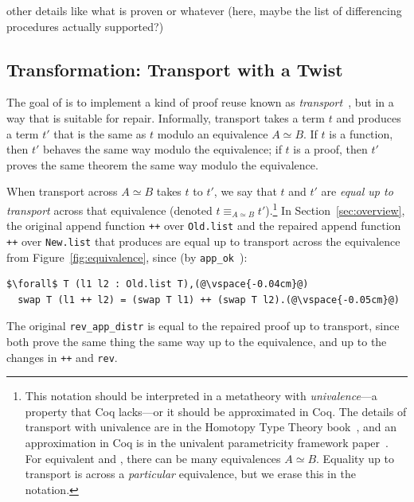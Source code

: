 other details like what is proven or whatever (here, maybe the list of differencing procedures actually supported?)

\subsection{Transformation: Transport with a Twist}
\label{sec:pi-spec-trans}

The goal of \toolnamec is to implement a kind of proof reuse known as \textit{transport}~\cite{univalent2013homotopy},
but in a way that is suitable for repair.
Informally, transport takes a term $t$ and produces a term $t'$ that is the same as $t$ modulo an equivalence $A \simeq B$.
If $t$ is a function, then $t'$ behaves the same way modulo the equivalence;
if $t$ is a proof, then $t'$ proves the same theorem the same way modulo the equivalence.

When transport across $A \simeq B$ takes $t$ to $t'$,
we say that $t$ and $t'$ are \textit{equal up to transport}
across that equivalence (denoted $t \equiv_{A \simeq B} t'$).\footnote{This notation should be interpreted in a metatheory with \textit{univalence}---a property that Coq lacks---or it should be approximated in Coq.
The details of transport with univalence are in the Homotopy Type Theory book~\cite{univalent2013homotopy}, and an approximation in Coq is in the univalent parametricity framework paper~\cite{tabareau2017equivalences}. For equivalent \Aa and \B, there can be many equivalences $A \simeq B$.
Equality up to transport is across a \textit{particular} equivalence, but we erase this in the 
notation.}
In Section~\ref{sec:overview}, the original append function \lstinline{++} over \lstinline{Old.list}
and the repaired append function \lstinline{++} over \lstinline{New.list} that \toolnamec produces are
equal up to transport across the equivalence from Figure~\ref{fig:equivalence}, since (by \lstinline{app_ok}~\href{https://github.com/uwplse/pumpkin-pi/blob/v2.0.0/plugin/coq/Swap.v}{}):

\begin{lstlisting}
$\forall$ T (l1 l2 : Old.list T),(@\vspace{-0.04cm}@)
  swap T (l1 ++ l2) = (swap T l1) ++ (swap T l2).(@\vspace{-0.05cm}@)
\end{lstlisting}
The original \lstinline{rev_app_distr} is equal to the repaired proof up to transport,
since both prove the same thing the same way up to the equivalence, and up to the changes in \lstinline{++}
and \lstinline{rev}.

